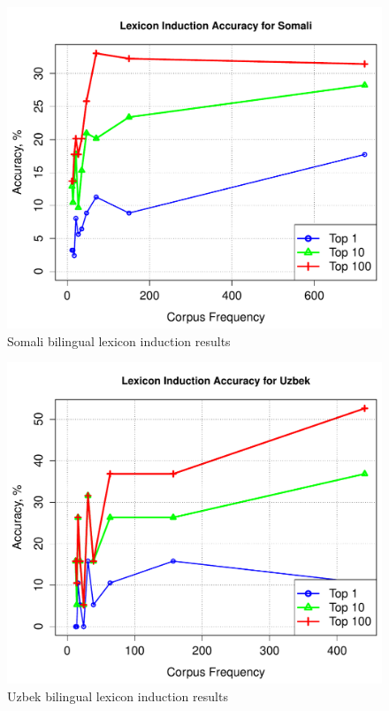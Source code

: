 \documentclass[11pt]{article}
\begin{document}
\begin{figure}
\begin{center}
\includegraphics[width=0.9 \linewidth]{../byFreqGraphs/so/lexinductnew.pdf}
\vskip -0.15in
\caption{Somali bilingual lexicon induction results}
\label{fig:bli.so} 
\end{center}
\end{figure}

\begin{figure}
\begin{center}
\includegraphics[width=0.9 \linewidth]{../byFreqGraphs/uz/lexinductnew.pdf}
\vskip -0.15in
\caption{Uzbek bilingual lexicon induction results}
\label{fig:bli.uz} 
\end{center}
\end{figure}
\end{document}
